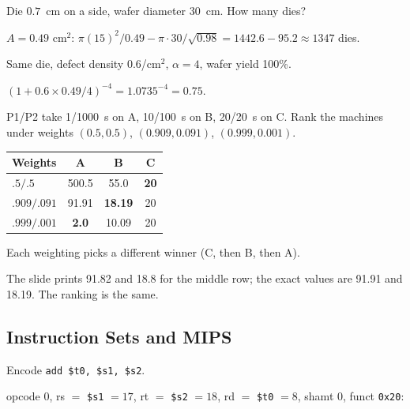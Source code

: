 \begin{exercise}
Die $0.7$~cm on a side, wafer diameter 30~cm. How many dies?
\end{exercise}
\begin{solution}
$A=0.49\text{ cm}^2$:
$\pi(15)^2/0.49 - \pi\cdot30/\sqrt{0.98} = 1442.6 - 95.2 \approx 1347$ dies.
\end{solution}

\begin{exercise}
Same die, defect density $0.6$/cm$^2$, $\alpha=4$, wafer yield 100\%.
\end{exercise}
\begin{solution}
$(1 + 0.6\times0.49/4)^{-4} = 1.0735^{-4} = 0.75$.
\end{solution}

\begin{exercise}
P1/P2 take 1/1000~s on A, 10/100~s on B, 20/20~s on C. Rank the machines
under weights $(0.5,0.5)$, $(0.909,0.091)$, $(0.999,0.001)$.
\end{exercise}
\begin{solution}
\begin{tabular}[t]{@{}lccc@{}}
Weights & A & B & C \\
\hline
$.5/.5$     & 500.5 & 55.0  & \textbf{20} \\
$.909/.091$ & 91.91 & \textbf{18.19} & 20 \\
$.999/.001$ & \textbf{2.0} & 10.09 & 20 \\
\end{tabular}

Each weighting picks a different winner (C, then B, then A). 
\end{solution}
\begin{remark}
\slidefix{} The slide prints 91.82 and 18.8 for the middle row; the exact values
are 91.91 and 18.19. The ranking is the same.
\end{remark}

\subsection{Instruction Sets and MIPS}

\begin{exercise}
Encode \texttt{add \$t0, \$s1, \$s2}.
\end{exercise}
\begin{solution}
opcode $0$, rs $=$ \texttt{\$s1} $=17$, rt $=$ \texttt{\$s2} $=18$, rd $=$ \texttt{\$t0} $=8$, shamt $0$, funct
\texttt{0x20}:
\end{solution}

